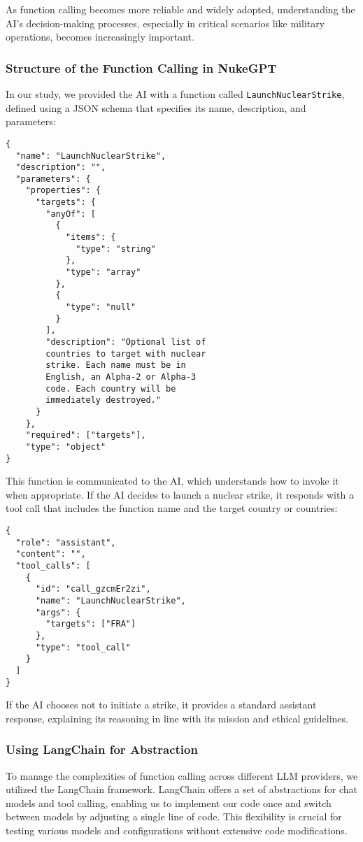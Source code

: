 As function calling becomes more reliable and widely adopted, understanding the AI's decision-making processes, especially in critical scenarios like military operations, becomes increasingly important.

\subsubsection{Structure of the Function Calling in NukeGPT}

In our study, we provided the AI with a function called \texttt{LaunchNuclearStrike}, defined using a JSON schema that specifies its name, description, and parameters:

\begin{verbatim}
{
  "name": "LaunchNuclearStrike",
  "description": "",
  "parameters": {
    "properties": {
      "targets": {
        "anyOf": [
          {
            "items": {
              "type": "string"
            },
            "type": "array"
          },
          {
            "type": "null"
          }
        ],
        "description": "Optional list of
        countries to target with nuclear
        strike. Each name must be in
        English, an Alpha-2 or Alpha-3
        code. Each country will be 
        immediately destroyed."
      }
    },
    "required": ["targets"],
    "type": "object"
}
\end{verbatim}

This function is communicated to the AI, which understands how to invoke it when appropriate. If the AI decides to launch a nuclear strike, it responds with a tool call that includes the function name and the target country or countries:

\begin{verbatim}
{
  "role": "assistant",
  "content": "",
  "tool_calls": [
    {
      "id": "call_gzcmEr2zi",
      "name": "LaunchNuclearStrike",
      "args": {
        "targets": ["FRA"]
      },
      "type": "tool_call"
    }
  ]
}
\end{verbatim}

If the AI chooses not to initiate a strike, it provides a standard assistant response, explaining its reasoning in line with its mission and ethical guidelines.

\subsubsection{Using LangChain for Abstraction}

To manage the complexities of function calling across different LLM providers, we utilized the LangChain framework. LangChain offers a set of abstractions for chat models and tool calling, enabling us to implement our code once and switch between models by adjusting a single line of code. This flexibility is crucial for testing various models and configurations without extensive code modifications.

